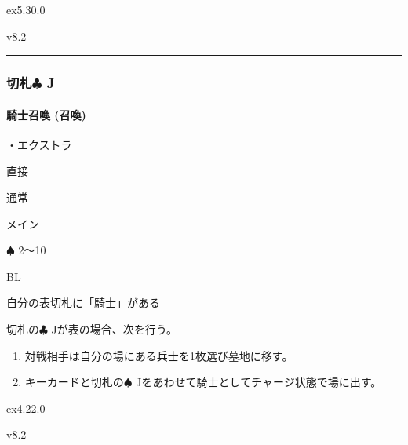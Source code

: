 \documentclass[letterpaper,10pt,dvipdfmx]{sphinxmanual}
\begin{document}
\sphinxAtStartPar
{}  ex5.30.0

\sphinxAtStartPar
{}  v8.2


\bigskip\hrule\bigskip



\subsubsection{切札{\normalsize $\clubsuit$} J}
\label{\detokenize{auto/frameActionlist:id83}}

\paragraph{騎士召喚 (召喚)}
\label{\detokenize{auto/frameActionlist:act-summonknight}}\label{\detokenize{auto/frameActionlist:id84}}
\sphinxAtStartPar
{}

\sphinxAtStartPar
・エクストラ

\sphinxAtStartPar
{} 直接

\sphinxAtStartPar
{} 通常

\sphinxAtStartPar
{} メイン

\sphinxAtStartPar
{} {\normalsize $\spadesuit$} 2〜10

\sphinxAtStartPar
{} BL

\sphinxAtStartPar
{}

\sphinxAtStartPar
自分の表切札に「騎士」がある

\sphinxAtStartPar
{}

\sphinxAtStartPar
切札の{\normalsize $\clubsuit$} Jが表の場合、次を行う。
\begin{enumerate}
%
\item {} 
\sphinxAtStartPar
対戦相手は自分の場にある兵士を1枚選び墓地に移す。

\item {} 
\sphinxAtStartPar
キーカードと切札の{\normalsize $\spadesuit$} Jをあわせて騎士としてチャージ状態で場に出す。

\end{enumerate}

\sphinxAtStartPar
{}  ex4.22.0

\sphinxAtStartPar
{}  v8.2
\end{document}
